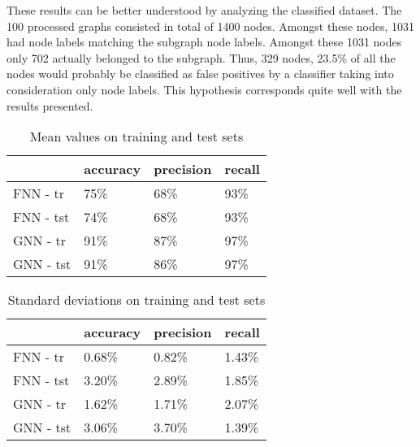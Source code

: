 These results can be better understood by analyzing the classified dataset. The 100 processed graphs consisted in total of 1400 nodes. Amongst these nodes, 1031 had node labels matching the subgraph node labels. Amongst these 1031 nodes only 702 actually belonged to the subgraph. Thus, 329 nodes, 23.5\% of all the nodes would probably be classified as false positives by a classifier taking into consideration only node labels. This hypothesis corresponds quite well with the results presented.

\begin{table}[h!]
	\begin{center}
	\begin{tabular}{llll}
	\toprule
	& accuracy & precision & recall \\
	\midrule
	FNN - tr &	75\% &  68\% &  93\% \\
	FNN - tst &	74\% &  68\% &  93\% \\
	GNN - tr &	91\% &  87\% &  97\% \\
	GNN - tst &	91\% &  86\% &  97\% \\
	\bottomrule
	\end{tabular}
	\caption{Mean values on training and test sets}
	\label{tab:crossmean}
	\end{center}
\end{table}

\begin{table}[h!]
	\begin{center}
	\begin{tabular}{llll}
	\toprule
	& accuracy & precision & recall \\
	\midrule
	FNN - tr &	0.68\% &  0.82\% &  1.43\% \\
	FNN - tst &	3.20\% &  2.89\% &  1.85\% \\
	GNN - tr &	1.62\% &  1.71\% &  2.07\% \\
	GNN - tst &	3.06\% &  3.70\% &  1.39\% \\
	\bottomrule
	\end{tabular}
	\caption{Standard deviations on training and test sets}
	\label{tab:crossstd}
	\end{center}
\end{table}
